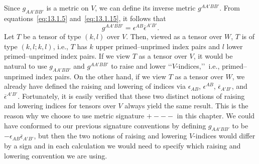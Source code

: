 Since \(g_{AA'BB'}\) is a metric on \(V\), we can define its inverse metric
\(g^{AA'BB'}\). From equations~\eqref{eq:13.1.5} and~\eqref{eq:13.1.15}, it follows
that
\begin{equation}
  g^{AA'BB'}=\epsilon^{AB}\overline\epsilon^{A'B'}.
  \tag{13.1.18}\label{eq:13.1.18}
\end{equation}
Let \(T\) be a tensor of type \((k,l)\) over \(V\). Then, viewed as a tensor over
\(W\), \(T\) is of type \((k,l;k,l)\), i.e., \(T\) has \(k\) upper
primed--unprimed index pairs and \(l\) lower primed--unprimed index pairs. If we
view \(T\) as a tensor over \(V\), it would be natural to use \(g_{AA'BB'}\) and
\(g^{AA'BB'}\) to raise and lower \lq\lq \(V\)-indices,\rq\rq\ i.e.,
primed--unprimed index pairs. On the other hand, if we view \(T\) as a tensor over
\(W\), we already have defined the raising and lowering of indices via
\(\epsilon_{AB}\), \(\epsilon^{AB}\), \(\overline\epsilon_{A'B'}\), and
\(\overline\epsilon^{A'B'}\). Fortunately, it is easily verified that these two
distinct notions of raising and lowering indices for tensors over \(V\) always yield
the same result. This is the reason why we choose to use metric signature \(+---\) in
this chapter. We could have conformed to our previous signature conventions by
defining \(g_{AA'BB'}\) to be
\(-\epsilon_{AB}\overline\epsilon_{A'B'}\), but then the two notions of raising and
lowering \(V\)-indices would differ by a sign and in each calculation we would need
to specify which raising and lowering convention we are using.

